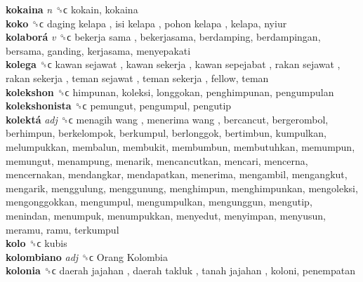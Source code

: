 \textbf{kokaina} \emph{n}  ␝ϲ  kokain, kokaina  \\
\textbf{koko} ␝ϲ   daging kelapa ,  isi kelapa ,  pohon kelapa , kelapa, nyiur  \\
\textbf{kolaborá} \emph{v}  ␝ϲ   bekerja sama , bekerjasama, berdamping, berdampingan, bersama, ganding, kerjasama, menyepakati  \\
\textbf{kolega} ␝ϲ   kawan sejawat ,  kawan sekerja ,  kawan sepejabat ,  rakan sejawat ,  rakan sekerja ,  teman sejawat ,  teman sekerja , fellow, teman  \\
\textbf{kolekshon} ␝ϲ  himpunan, koleksi, longgokan, penghimpunan, pengumpulan  \\
\textbf{kolekshonista} ␝ϲ  pemungut, pengumpul, pengutip  \\
\textbf{kolektá} \emph{adj}  ␝ϲ   menagih wang ,  menerima wang , bercancut, bergerombol, berhimpun, berkelompok, berkumpul, berlonggok, bertimbun, kumpulkan, melumpukkan, membalun, membukit, membumbun, membutuhkan, memumpun, memungut, menampung, menarik, mencancutkan, mencari, mencerna, mencernakan, mendangkar, mendapatkan, menerima, mengambil, mengangkut, mengarik, menggulung, menggunung, menghimpun, menghimpunkan, mengoleksi, mengonggokkan, mengumpul, mengumpulkan, mengunggun, mengutip, menindan, menumpuk, menumpukkan, menyedut, menyimpan, menyusun, meramu, ramu, terkumpul  \\
\textbf{kolo} ␝ϲ  kubis  \\
\textbf{kolombiano} \emph{adj}  ␝ϲ   Orang Kolombia   \\
\textbf{kolonia} ␝ϲ   daerah jajahan ,  daerah takluk ,  tanah jajahan , koloni, penempatan  \\
